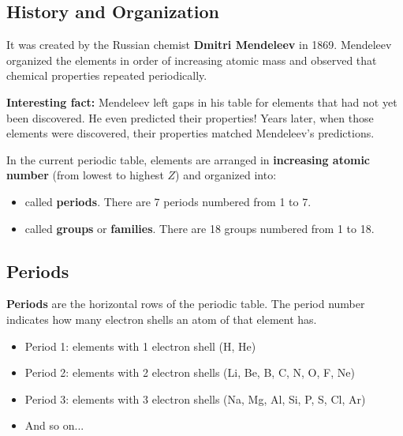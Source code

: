 \subsection{History and Organization}
It was created by the Russian chemist \textbf{Dmitri Mendeleev} in 1869. Mendeleev organized the elements in order of increasing atomic mass and observed that chemical properties repeated periodically.
\begin{remark}
    \textbf{Interesting fact:} Mendeleev left gaps in his table for elements that had not yet been discovered. He even predicted their properties! Years later, when those elements were discovered, their properties matched Mendeleev's predictions.
\end{remark}
In the current periodic table, elements are arranged in \textbf{increasing atomic number} (from lowest to highest \( Z \)) and organized into:
\begin{itemize}
    \item {} called \textbf{periods}. There are 7 periods numbered from 1 to 7.
    \item {} called \textbf{groups} or \textbf{families}. There are 18 groups numbered from 1 to 18.
\end{itemize}

\subsection{Periods}
\textbf{Periods} are the horizontal rows of the periodic table. The period number indicates how many electron shells an atom of that element has.
\begin{itemize}
    \item Period 1: elements with 1 electron shell (H, He)
    \item Period 2: elements with 2 electron shells (Li, Be, B, C, N, O, F, Ne)
    \item Period 3: elements with 3 electron shells (Na, Mg, Al, Si, P, S, Cl, Ar)
    \item And so on...
\end{itemize}

